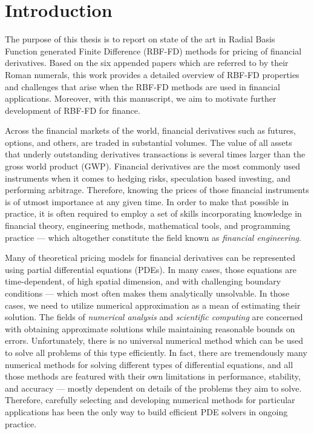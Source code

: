 \documentclass{UUThesisTemplate}
\begin{document}
\chapter{Introduction}
\label{ch:introduction}
\par The purpose of this thesis is to report on state of the art in Radial Basis Function generated Finite Difference (RBF-FD) methods for pricing of financial derivatives. Based on the six appended papers which are referred to by their Roman numerals, this work provides a detailed overview of RBF-FD properties and challenges that arise when the RBF-FD methods are used in financial applications. Moreover, with this manuscript, we aim to motivate further development of RBF-FD for finance.
\par Across the financial markets of the world, financial derivatives such as futures, options, and others, are traded in substantial volumes. The value of all assets that underly outstanding derivatives transactions is several times larger than the gross world product (GWP). Financial derivatives are the most commonly used instruments when it comes to hedging risks, speculation based investing, and performing arbitrage. Therefore, knowing the prices of those financial instruments is of utmost importance at any given time. In order to make that possible in practice, it is often required to employ a set of skills incorporating knowledge in financial theory, engineering methods, mathematical tools, and programming practice --- which altogether constitute the field known as \emph{financial engineering}. 
\par Many of theoretical pricing models for financial derivatives can be represented using partial differential equations (PDEs). In many cases, those equations are time-dependent, of high spatial dimension, and with challenging boundary conditions --- which most often makes them analytically unsolvable. In those cases, we need to utilize numerical approximation as a mean of estimating their solution. The fields of \emph{numerical analysis} and \emph{scientific computing} are concerned with obtaining approximate solutions while maintaining reasonable bounds on errors. Unfortunately, there is no universal numerical method which can be used to solve all problems of this type efficiently. In fact, there are tremendously many numerical methods for solving different types of differential equations, and all those methods are featured with their own limitations in performance, stability, and accuracy --- mostly dependent on details of the problems they aim to solve. Therefore, carefully selecting and developing numerical methods for particular applications has been the only way to build efficient PDE solvers in ongoing practice. 
\end{document}
